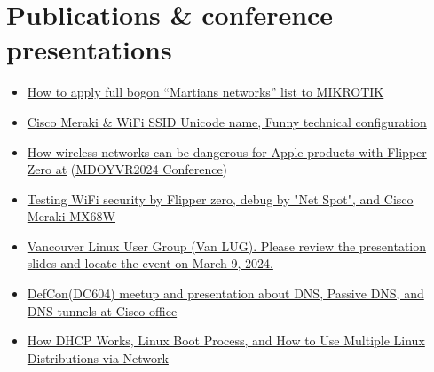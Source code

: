 \documentclass[11pt,oneside,a4paper,titlepage,pdfusetitle]{article}
\begin{document}
{\begin{minipage}{7.3cm}
    \section*{Publications \& conference presentations}
    \begin{itemize}[left=0pt]
        \item \href{https://medium.com/@leo2008k/how-to-apply-full-bogon-martians-networks-list-to-mikrotik-46fbffa7b813}{How to apply full bogon “Martians networks” list to MIKROTIK}
        \vspace*{0.22cm}

        \item \href{https://medium.com/@leo2008k/wifi-ssid-unicode-name-f3aa96f7d77}{Cisco Meraki \& WiFi SSID Unicode name, Funny technical configuration}
        \vspace*{0.22cm}

        \item \href{https://www.youtube.com/watch?v=9IEymzIXNzo}{How wireless networks can be dangerous for Apple products with Flipper Zero at} (\href{https://mdoyvr2024.com}{\underline{MDOYVR2024 Conference}})

        \item \href{https://medium.com/p/3840de96f71b}{Testing WiFi security by Flipper zero, debug by "Net Spot", and Cisco Meraki MX68W}
        
        \item \href{https://vanlug.ca/events/}{Vancouver Linux User Group (Van LUG). Please review the presentation slides and locate the event on March 9, 2024.}

        \item \href{https://www.meetup.com/defcon604/events/298244055/}{DefCon(DC604) meetup and presentation about DNS, Passive DNS, and DNS tunnels at Cisco office}

        \item \href{https://www.meetup.com/vanlug-bc/events/304671545/?_xtd=gqFyqTI0NTg4MjIzN6Fwo2FwaQ%253D%253D&from=ref}{How DHCP Works, Linux Boot Process, and How to Use Multiple Linux Distributions via Network}
        
    \end{itemize}


\end{minipage}
}%
\hfill
\end{document}
